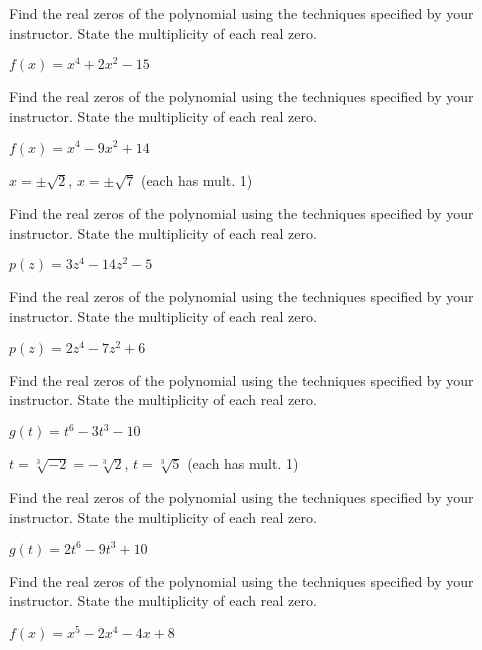 \documentclass{ximera}
\begin{document}
\begin{problem}
Find the real zeros of the polynomial using the techniques specified by your instructor.  State the multiplicity of each real zero.

$f(x) = x^4+2x^2 - 15$
\end{problem}

\begin{problem}
Find the real zeros of the polynomial using the techniques specified by your instructor.  State the multiplicity of each real zero.

$f(x) = x^4-9x^2+14$

$x = \pm \sqrt{2}$, $x = \pm \sqrt{7}$ (each has mult. 1)
\end{problem}

\begin{problem}
Find the real zeros of the polynomial using the techniques specified by your instructor.  State the multiplicity of each real zero.

$p(z) = 3z^4-14z^2-5$
\end{problem}

\begin{problem}
Find the real zeros of the polynomial using the techniques specified by your instructor.  State the multiplicity of each real zero.

$p(z) = 2z^4-7z^2+6$
\end{problem}

\begin{problem}
Find the real zeros of the polynomial using the techniques specified by your instructor.  State the multiplicity of each real zero.

$g(t) = t^6-3t^3-10$

\begin{solution}
$t = \sqrt[3]{-2} = -\sqrt[3]{2}$, $t = \sqrt[3]{5}$ (each has mult. 1)
\end{solution}
\end{problem}

\begin{problem}
Find the real zeros of the polynomial using the techniques specified by your instructor.  State the multiplicity of each real zero.

$g(t) = 2t^6-9t^3+10$
\end{problem}

\begin{problem}
Find the real zeros of the polynomial using the techniques specified by your instructor.  State the multiplicity of each real zero.

$f(x) = x^5-2x^4-4x+8$
\end{problem}
\end{document}
